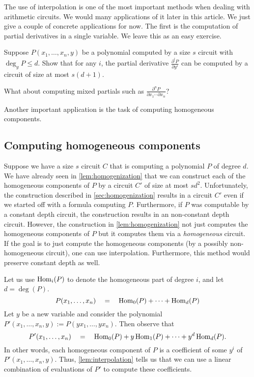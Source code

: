 The use of interpolation is one of the most important methods when dealing with arithmetic circuits. We would many applications of it later in this article. We just give a couple of concrete applications for now. The first is the computation of partial derivatives in a single variable. We leave this as an easy exercise. 

\begin{exercise}
Suppose $P(x_1,\ldots, x_n,y)$ be a polynomial computed by a size $s$ circuit with $\deg_y P \leq d$. Show that for any $i$, the partial derivative
$\frac{\partial^i P}{\partial y^i}$ can be computed by a circuit of size at most $s(d+1)$. 

What about computing mixed partials such as $\frac{\partial^n P}{\partial x_1 \cdots \partial x_n}$?
\end{exercise}

\noindent 
Another important application is the task of computing homogeneous components. 

\subsection{Computing homogeneous components}

Suppose we have a size $s$ circuit $C$ that is computing a polynomial $P$ of degree $d$.
We have already seen in \autoref{lem:homogenization} that we can construct each of the homogeneous components of $P$ by a circuit $C'$ of size at most $sd^2$.
Unfortunately, the construction described in \autoref{sec:homogenization} results in a circuit $C'$ even if we started off with a formula computing $P$.
Furthermore, if $P$ was computable by a constant depth circuit, the construction results in an non-constant depth circuit.
However, the construction in \autoref{lem:homogenization} not just computes the homogeneous components of $P$ but it computes them via a \emph{homogeneous} circuit. If the goal is to just compute the homogeneous components (by a possibly non-homogeneous circuit), one can use interpolation. Furthermore, this method would preserve constant depth as well.

Let us use $\operatorname{Hom}_i(P)$ to denote the homogeneous part of degree $i$, and let $d = \deg(P)$.
\[
P(x_1,\ldots, x_n) \quad = \quad \operatorname{Hom}_0(P) + \cdots + \operatorname{Hom}_d(P)
\]
Let $y$ be a new variable and consider the polynomial $P'(x_1,\ldots, x_n, y) := P(yx_1, \ldots, y x_n)$. Then observe that
\[
P'(x_1,\ldots, x_n) \quad = \quad \operatorname{Hom}_0(P) + y\operatorname{Hom}_1(P) + \cdots + y^d \operatorname{Hom}_d(P).
\]
In other words, each homogeneous component of $P$ is a coefficient of some $y^i$ of $P'(x_1,\ldots, x_n,y)$. Thus, \autoref{lem:interpolation} tells us that we can use a linear combination of evaluations of $P'$ to compute these coefficients. 

